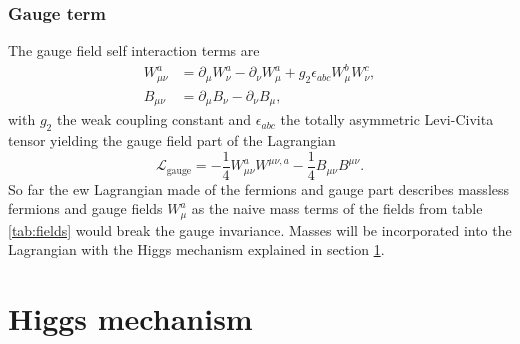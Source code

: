 \subsubsection*{Gauge term}
The gauge field self interaction terms are
\begin{align}
    W_{\mu\nu}^a & =\partial_\mu W_\nu^a-\partial_\nu W_\mu^a+g_2\epsilon_{abc}W_\mu^b W_\nu^c, \\
    B_{\mu\nu}   & =\partial_\mu B_\nu-\partial_\nu B_\mu,
\end{align}
with $g_2$ the weak coupling constant and $\epsilon_{abc}$ the totally asymmetric Levi-Civita tensor yielding the gauge field part of the Lagrangian
\begin{equation}
    \mathcal {L}_\text{gauge} = -\frac{1}{4} W_{\mu\nu}^a W^{\mu\nu,a} - \frac{1}{4}B_{\mu\nu}B^{\mu\nu}.
\end{equation}
So far the \ac{ew} Lagrangian made of the fermions and gauge part describes massless fermions and gauge fields $W^a_\mu$ as the naive mass terms of the fields from table \ref{tab:fields} would break the gauge invariance.
Masses will be incorporated into the Lagrangian with the Higgs mechanism explained in section \ref{sec:higgs_mechanism}.

\section{Higgs mechanism}\label{sec:higgs_mechanism}

